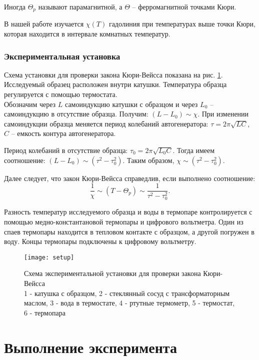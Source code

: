 \documentclass{lab}
\begin{document}
Иногда $ \Theta_p $ называют парамагнитной, а $ \Theta $ -- ферромагнитной точками Кюри.

В нашей работе изучается $ \chi(T) $ гадолиния при температурах выше точки Кюри, которая
находится в интервале комнатных температур.

\subsubsection*{Экспериментальная установка}
\hspace*{\parindent}
Схема установки для проверки закона Кюри-Вейсса показана на рис. \ref{setup}.
Исследуемый образец расположен внутри катушки. Температура образца регулируется с помощью
термостата.\\
\hspace*{\parindent}
Обозначим через $ L $ самоиндукцию катушки с образцом и через $ L_0 $ --
самоиндукцию в отсутствие образца. Получим: $ (L - L_0) \sim \chi $. При изменении самоиндукции 
образца меняется период колебаний автогенератора: $ \tau = 2\pi\sqrt{LC} $, $ C $ -- емкость
контура автогенератора.

Период колебаний в отсутствие образца: $ \tau_0 = 2\pi\sqrt{L_0C} $. Тогда имеем соотношение:
$ (L - L_0) \sim (\tau^2 - \tau_0^2) $. Таким образом, $ \chi \sim (\tau^2 - \tau_0^2) $.

Далее следует, что закон Кюри-Вейсса справедлив, если выполнено соотношение:
\begin{equation}
\dfrac{1}{\chi} \sim (T - \Theta_p) \sim \dfrac{1}{\tau^2 - \tau_0^2}.
\end{equation}

Разность температур исследуемого образца и воды в термопаре контролируется с помощью
медно-константановой термопары и цифрового вольтметра. Один из спаев термопары находится
в тепловом контакте с образцом, а другой погружен в воду. Концы термопары подключены к
цифровому вольтметру.

\begin{figure}[H]
	\centering
	\texttt{[image: setup]}
	\caption{\footnotesize
	Схема экспериментальной установки для проверки закона Кюри-Вейсса\\
	1 - катушка с образцом, 2 - стеклянный сосуд с трансформаторным маслом, 3 - вода в
	термостате, 4 - ртутные термометр, 5 - термостат, 6 - термопара
	}
	\label{setup}
\end{figure}

\section*{Выполнение эксперимента}
\end{document}
